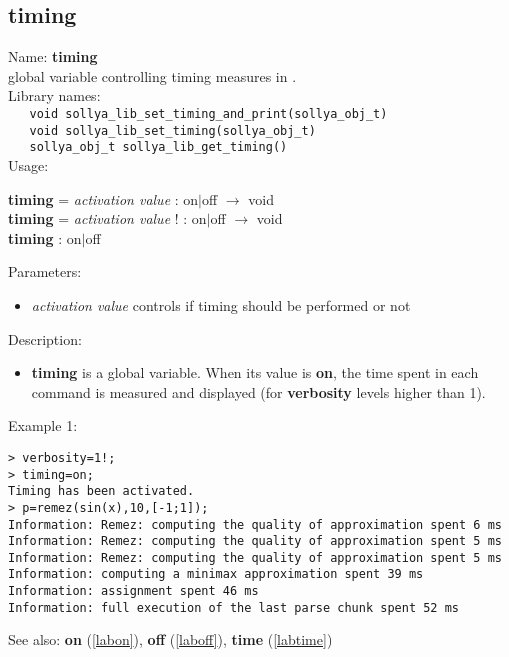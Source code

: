 \subsection{timing}
\label{labtiming}
\noindent Name: \textbf{timing}\\
\phantom{aaa}global variable controlling timing measures in \sollya.\\[0.2cm]
\noindent Library names:\\
\verb|   void sollya_lib_set_timing_and_print(sollya_obj_t)|\\
\verb|   void sollya_lib_set_timing(sollya_obj_t)|\\
\verb|   sollya_obj_t sollya_lib_get_timing()|\\[0.2cm]
\noindent Usage: 
\begin{center}
\textbf{timing} = \emph{activation value} : \textsf{on$|$off} $\rightarrow$ \textsf{void}\\
\textbf{timing} = \emph{activation value} ! : \textsf{on$|$off} $\rightarrow$ \textsf{void}\\
\textbf{timing} : \textsf{on$|$off}\\
\end{center}
Parameters: 
\begin{itemize}
\item \emph{activation value} controls if timing should be performed or not
\end{itemize}
\noindent Description: \begin{itemize}

\item \textbf{timing} is a global variable. When its value is \textbf{on}, the time spent in each 
   command is measured and displayed (for \textbf{verbosity} levels higher than 1).
\end{itemize}
\noindent Example 1: 
\begin{center}\begin{minipage}{15cm}\begin{Verbatim}[frame=single]
> verbosity=1!;
> timing=on;
Timing has been activated.
> p=remez(sin(x),10,[-1;1]);
Information: Remez: computing the quality of approximation spent 6 ms
Information: Remez: computing the quality of approximation spent 5 ms
Information: Remez: computing the quality of approximation spent 5 ms
Information: computing a minimax approximation spent 39 ms
Information: assignment spent 46 ms
Information: full execution of the last parse chunk spent 52 ms
\end{Verbatim}
\end{minipage}\end{center}
See also: \textbf{on} (\ref{labon}), \textbf{off} (\ref{laboff}), \textbf{time} (\ref{labtime})
